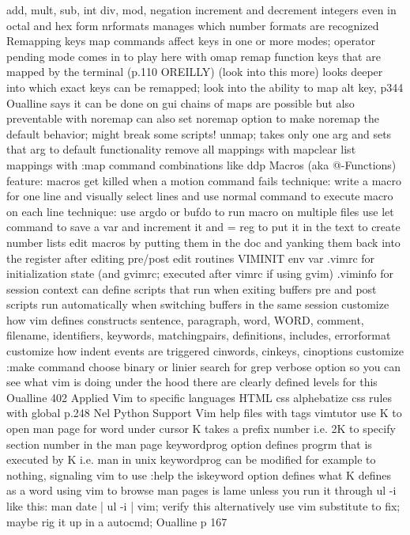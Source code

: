 \documentclass[12pt]{book}
\begin{document}
{{      add, mult, sub, int div, mod, negation
    increment and decrement integers even in octal and hex form
      nrformats manages which number formats are recognized
  Remapping keys
    map commands affect keys in one or more modes; operator pending mode comes in to play here with omap
    remap function keys that are mapped by the terminal (p.110 OREILLY) (look into this more)
      looks deeper into which exact keys can be remapped; look into the ability to map alt key, p344 Oualline says it can be done on gui
    chains of maps are possible but also preventable with noremap
      can also set noremap option to make noremap the default behavior; might break some scripts!
    unmap; takes only one arg and sets that arg to default functionality
    remove all mappings with mapclear
    list mappings with :map
  command combinations like ddp
  Macros (aka @-Functions)
    feature: macros get killed when a motion command fails
    technique: write a macro for one line and visually select lines and use normal command to execute macro on each line
    technique: use argdo or bufdo to run macro on multiple files
    use let command to save a var and increment it and = reg to put it in the text to create number lists
    edit macros by putting them in the doc and yanking them back into the register after editing
  pre/post edit routines
    VIMINIT env var
    .vimrc for initialization state (and gvimrc; executed after vimrc if using gvim)
    .viminfo for session context
    can define scripts that run when exiting buffers
    pre and post scripts run automatically when switching buffers in the same session
  customize how vim defines constructs
    sentence, paragraph, word, WORD, comment, filename, identifiers, keywords, matchingpairs, definitions, includes, errorformat
  customize how indent events are triggered
    cinwords, cinkeys, cinoptions
  customize :make command
  choose binary or linier search for grep
  verbose option so you can see what vim is doing under the hood
    there are clearly defined levels for this Oualline 402
Applied Vim to specific languages
  HTML
  css
    alphebatize css rules with global p.248 Nel
  Python
Support
  Vim help files with tags
  vimtutor
  use K to open man page for word under cursor
    K takes a prefix number i.e. 2K to specify section number in the man page
    keywordprog option defines progrm that is executed by K i.e. man in unix
    keywordprog can be modified for example to nothing, signaling vim to use :help
    the iskeyword option defines what K defines as a word
    using vim to browse man pages is lame unless you run it through ul -i like this: man date | ul -i | vim; verify this
      alternatively use vim substitute to fix; maybe rig it up in a autocmd; Oualline p 167

}}
\end{document}

